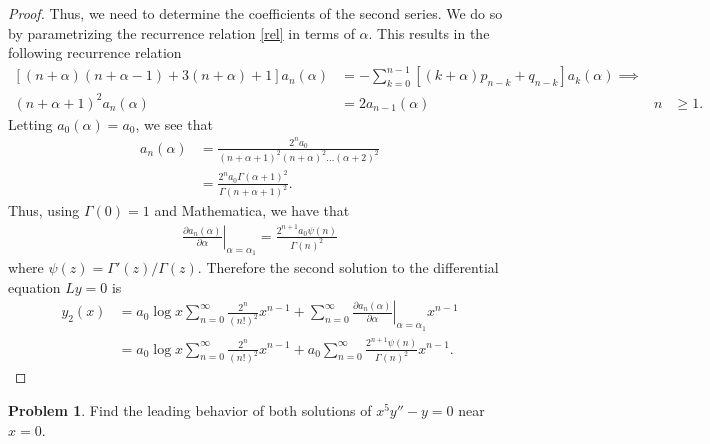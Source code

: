 \documentclass[12pt]{article}
\theoremstyle{definition}
\newtheorem{problem}{Problem}
\begin{document}
\begin{proof}
  Thus, we need to determine the coefficients of the second series. We do so by parametrizing the recurrence relation \eqref{rel} in terms of $\alpha$.
  This results in the following recurrence relation
  \begin{align*}
    \left[(n+\alpha)(n+\alpha-1) + 3(n+\alpha) +1  \right] a_n(\alpha) &= - \sum_{k=0}^{n-1}\left[(k+\alpha)p_{n-k} + q_{n-k}\right]a_k(\alpha)\implies & &\\
    (n+\alpha +1)^2 a_n(\alpha)&=2a_{n-1}(\alpha) &n &\geq1.
  \end{align*}
  Letting $a_0(\alpha) = a_0$,  we see that
  \begin{align*}
    a_n(\alpha) &= \frac{2^n a_0}{(n+\alpha+1)^2(n+\alpha)^2\dots(\alpha+2)^2} \\
    &=\frac{2^n a_0 \Gamma(\alpha+1)^2}{\Gamma(n+\alpha+1)^2}.
  \end{align*}
  Thus, using $\Gamma(0)=1$ and Mathematica, we have that
  \begin{align*}
    \left.\frac{\partial a_n(\alpha)}{\partial \alpha}\right|_{\alpha=\alpha_1} = \frac{2^{n+1} a_0 \psi(n)}{\Gamma(n)^2}
  \end{align*}
  where $\psi(z) = \Gamma'(z)/\Gamma(z)$. Therefore the second solution to the differential equation $Ly=0$ is
  \begin{align*}
    y_2(x)&=a_0\log x\sum_{n=0}^{\infty} \frac{2^n}{(n!)^2}x^{n-1} + \sum_{n=0}^{\infty}\left.\frac{\partial a_n(\alpha)}{\partial \alpha}\right|_{\alpha=\alpha_1}x^{n-1}\\
    &=a_0\log x\sum_{n=0}^{\infty} \frac{2^n}{(n!)^2}x^{n-1} + a_0\sum_{n=0}^{\infty}\frac{2^{n+1} \psi(n)}{\Gamma(n)^2}x^{n-1}.
  \end{align*}
\end{proof}
\newpage


\begin{problem}
  Find the leading behavior of both solutions of $x^5y'' - y = 0$ near $x=0$.
\end{problem}
\end{document}
